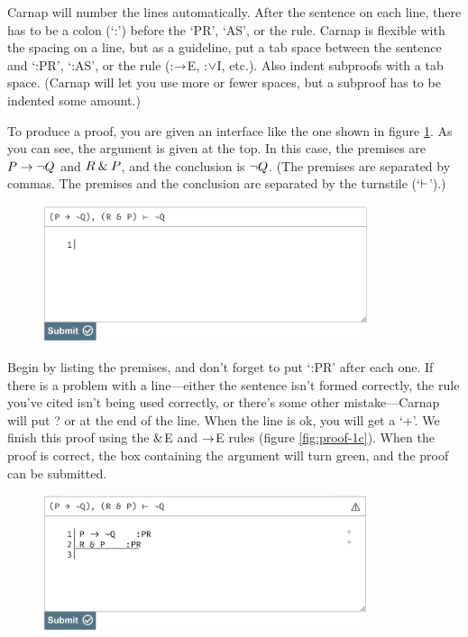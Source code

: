 Carnap will number the lines automatically. After the sentence on each line, there has to be a colon (`:') before the `PR', `AS', or the rule. Carnap is flexible with the spacing on a line, but as a guideline, put a tab space between the sentence and `:PR', `:AS', or the rule (:$\rightarrow$E, :$\vee$I, etc.). Also indent subproofs with a tab space. (Carnap will let you use more or fewer spaces, but a subproof has to be indented some amount.)

To produce a proof, you are given an interface like the one shown in figure \ref{fig:proof-1a}. As you can see, the argument is given at the top. In this case, the premises are $P \rightarrow {\neg} Q$ and $R \mathbin{\&} P$, and the conclusion is ${\neg} Q$. (The premises are separated by commas. The premises and the conclusion are separated by the turnstile (`$\vdash$').)

\begin{figure}
\includegraphics[width=9.5cm]{textbook--1a.PNG}
\caption{}
\label{fig:proof-1a}
\end{figure}

Begin by listing the premises, and don't forget to put `:PR' after each one. If there is a problem with a line---either the sentence isn't formed correctly, the rule you've cited isn't being used correctly, or there's some other mistake---Carnap will put \textsf{?} or {\selectfont{}\relax}  at the end of the line. When the line is ok, you will get a `+'.
We finish this proof using the $\mathbin{\&}$E and $\rightarrow$E rules (figure \ref{fig:proof-1c}). When the proof is correct, the box containing the argument will turn green, and the proof can be submitted. 

\begin{figure}[h]
\includegraphics[width=9.5cm]{textbook--1b.PNG}
\caption{}
\label{fig:proof-1b}
\end{figure}

